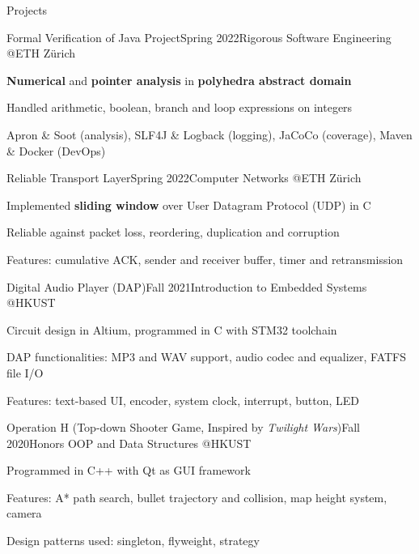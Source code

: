 \documentclass{resume}
\begin{document}
\begin{rSection}{Projects}
    \begin{rSubsection}{Formal Verification of Java Project}{Spring 2022}{Rigorous Software Engineering @ETH Zürich}{}
        \item \textbf{Numerical} and \textbf{pointer analysis} in \textbf{polyhedra abstract domain}
        \item Handled arithmetic, boolean, branch and loop expressions on integers
        \item Apron \& Soot (analysis), SLF4J \& Logback (logging), JaCoCo (coverage), Maven \& Docker (DevOps)
    \end{rSubsection}

    \begin{rSubsection}{Reliable Transport Layer}{Spring 2022}{Computer Networks @ETH Zürich}{}
        \item Implemented \textbf{sliding window} over User Datagram Protocol (UDP) in C
        \item Reliable against packet loss, reordering, duplication and corruption
        \item Features: cumulative ACK, sender and receiver buffer, timer and retransmission
    \end{rSubsection}

    \begin{rSubsection}{Digital Audio Player (DAP)}{Fall 2021}{Introduction to Embedded Systems @HKUST}{}
        \item Circuit design in Altium, programmed in C with STM32 toolchain
        \item DAP functionalities: MP3 and WAV support, audio codec and equalizer, FATFS file I/O
        \item Features: text-based UI, encoder, system clock, interrupt, button, LED
    \end{rSubsection}

    \begin{rSubsection}{Operation H (Top-down Shooter Game, Inspired by \emph{Twilight Wars})}{Fall 2020}{Honors OOP and Data Structures @HKUST}{}
        \item Programmed in C++ with Qt as GUI framework
        \item Features: A* path search, bullet trajectory and collision, map height system, camera
        \item Design patterns used: singleton, flyweight, strategy
    \end{rSubsection}
\end{rSection}
\end{document}
